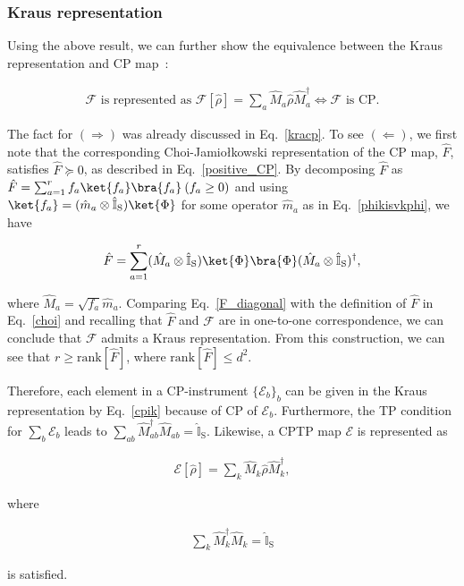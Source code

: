 \documentclass[preprint,pteplogo]{ptephy_v2}%
\numberwithin{equation}{section}
\theoremstyle{definition}
\newcommand{\ml}[1]{\mathcal{#1}}
\newcommand{\mr}[1]{\mathrm{#1}}
\newcommand{\mbb}[1]{\mathbb{#1}}
\newcommand{\aln}[1]{
\begin{align}
#1
\end{align}
}
\begin{document}
\subsubsection{Kraus representation}
Using the above result, we can further show the equivalence between the Kraus representation and CP map~\cite{wolf2012quantum}:
\aln{
\ml{F} \text{ is represented as } \ml{F}[\hat{\rho}]=\sum_a\hat{M}_a\hat{\rho}\hat{M}_a^\dag \Longleftrightarrow \text{$\ml{F}$ is CP.}
}
The fact for $(\Longrightarrow)$ was already discussed in Eq.~\eqref{kracp}.
To see $(\Longleftarrow)$, we first note that the corresponding Choi-Jamiołkowski representation of the CP map, $\hat{F}$, satisfies $\hat{F}\succeq 0$, as described in Eq.~\eqref{positive_CP}.
By decomposing $\hat{F}$ as $\hat{F}=\sum_{a=1}^rf_a\ket{f_a}\bra{f_a}\:(f_a\geq 0)$ and using $\ket{f_a}=(\hat{m}_a\otimes\hat{\mbb{I}}_\mr{S})\ket{\Phi}$ for some operator $\hat{m}_a$ as in Eq.~\eqref{phikisvkphi}, we have
\aln{\label{F_diagonal}
\hat{F}=\sum_{a=1}^r (\hat{M}_a\otimes\hat{\mbb{I}}_\mr{S})\ket{\Phi}\bra{\Phi}(\hat{M}_a\otimes\hat{\mbb{I}}_\mr{S})^\dag,
}
where $\hat{M}_a=\sqrt{f_a}\hat{m}_a$.
Comparing Eq.~\eqref{F_diagonal} with the definition of $\hat{F}$ in Eq.~\eqref{choi} and recalling that $\hat{F}$ and $\ml{F}$ are in one-to-one correspondence, we can conclude that $\ml{F}$ admits a Kraus representation.
From this construction, we can see that $r\geq \mr{rank}[\hat{F}]$, where $\mr{rank}[\hat{F}]\leq d^2$.

Therefore, each element in a CP-instrument $\{\ml{E}_b\}_b$ can be given in the Kraus representation by Eq.~\eqref{cpik} because of CP of $\ml{E}_b$.
Furthermore, the TP condition for $\sum_b\ml{E}_b$ leads to $\sum_{ab}\hat{M}_{ab}^\dag\hat{M}_{ab}=\hat{\mbb{I}}_\mr{S}$.
Likewise, a CPTP map $\ml{E}$ is represented as 
\aln{\label{eq:KrausRep}
\ml{E}[\hat{\rho}]=\sum_k\hat{M}_k\hat{\rho}\hat{M}_k^\dag,
}
where
\aln{\label{eq:TPKraus}
\sum_{k}\hat{M}_{k}^\dag\hat{M}_{k}=\hat{\mbb{I}}_\mr{S}
}
is satisfied.
\end{document}
